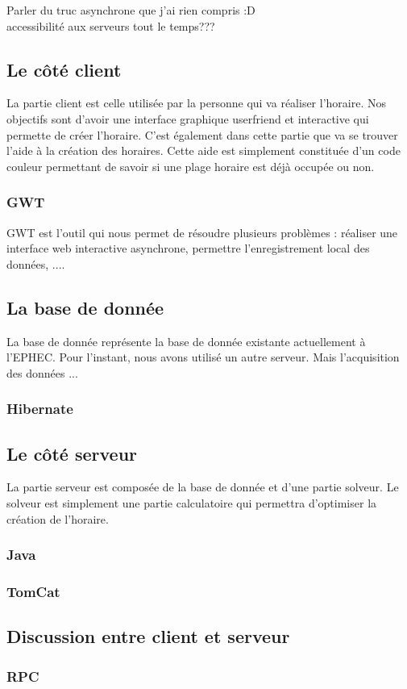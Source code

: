   Parler du truc asynchrone que j'ai rien compris :D\\

  accessibilité aux serveurs tout le temps??? \\

  \subsection{Le côté client}

  La partie client est celle utilisée par la personne qui va réaliser l'horaire. 
  Nos objectifs sont d'avoir une interface graphique userfriend et interactive qui permette de créer l'horaire.
  C'est également dans cette partie que va se trouver l'aide à la création des horaires.
  Cette aide est simplement constituée d'un code couleur permettant de savoir si une plage horaire est déjà occupée ou non. \\

    \subsubsection{GWT}
    GWT est l'outil qui nous permet de résoudre plusieurs problèmes :
    réaliser une interface web interactive asynchrone, permettre l'enregistrement local des données, ....

  \subsection{La base de donnée}
  La base de donnée représente la base de donnée existante actuellement à l'EPHEC. Pour l'instant, nous avons utilisé un autre serveur.
  Mais l'acquisition des données ...

    \subsubsection{Hibernate}

  \subsection{Le côté serveur}
  La partie serveur est composée de la base de donnée et d'une partie solveur.
  Le solveur est simplement une partie calculatoire qui permettra d'optimiser la création de l'horaire.

    \subsubsection{Java}
    \subsubsection{TomCat}


  \subsection{Discussion entre client et serveur}
    \subsubsection{RPC}
